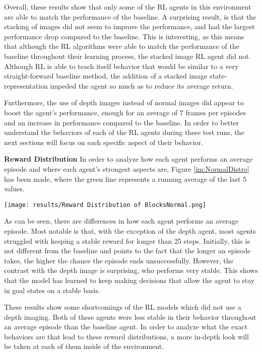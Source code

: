 Overall, these results show that only some of the RL agents in this environment are able 
to match the performance of the baseline. A surprising result, is that the stacking 
of images did not seem to improve the performance, and had the largest performance 
drop compared to the baseline. This is interesting, as this means that 
although the RL algorithms were able to match the performance of the baseline throughout 
their learning process, the stacked image RL agent did not. Although RL 
is able to teach itself behavior that would be similar to a very straight-forward 
baseline method, the addition of a stacked image state-representation impeded the 
agent so much as to reduce its average return.

Furthermore, the use of depth images instead of normal images did appear to boost the 
agent's performance, enough for an average of 7 frames per episodes and an increase in 
performance compared to the baseline. In order to better understand the behaviors
of each of the RL agents during these test runs, the next sections will focus 
on each specific aspect of their behavior.  \newline

\noindent
\textbf{Reward Distribution} \newline
In order to analyze how each agent performs an average episode and where each agent's 
strongest aspects are, Figure \ref{im:NormalDistro} has been made, 
where the green line represents a running average of the last 5 values.

\begin{Figure}
    \centering
    \texttt{[image: results/Reward Distribution of BlocksNormal.png]}
    \label{im:NormalDistro}
\end{Figure}

As can be seen, there are differences in how each agent performs an average episode. 
Most notable is that, with the exception of the depth agent, most agents struggled with 
keeping a stable reward for longer than 25 steps. Initially, this is not different from the 
baseline and points to the fact that the longer an episode takes, the higher the chance 
the episode ends unsuccessfully. However, the contrast with the depth image is surprising, 
who performs very stable. This shows that the model has learned to 
keep making decisions that allow the agent to stay in goal states on a stable basis.

These results show some 
shortcomings of the RL models which did not use a depth imaging. Both of these agents 
were less stable in their behavior throughout an average episode than the baseline agent. 
In order to analyze what the exact behaviors are that lead to these reward distributions, 
a more in-depth look will be taken at each of them inside of the environment. \newline

